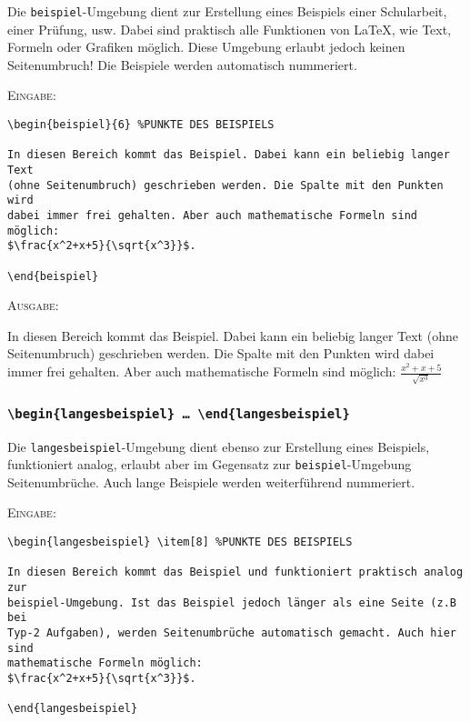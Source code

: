 \documentclass[a4paper,12pt]{article}
\begin{document}
Die \texttt{beispiel}-Umgebung dient zur Erstellung eines Beispiels einer Schularbeit, einer Prüfung, usw. Dabei sind praktisch alle Funktionen von \LaTeX, wie Text, Formeln oder Grafiken möglich. Diese Umgebung erlaubt jedoch keinen Seitenumbruch! Die Beispiele werden automatisch nummeriert.

\leer

\textsc{Eingabe:}
\begin{verbatim}
\begin{beispiel}{6} %PUNKTE DES BEISPIELS

In diesen Bereich kommt das Beispiel. Dabei kann ein beliebig langer Text
(ohne Seitenumbruch) geschrieben werden. Die Spalte mit den Punkten wird 
dabei immer frei gehalten. Aber auch mathematische Formeln sind möglich:
$\frac{x^2+x+5}{\sqrt{x^3}}$.

\end{beispiel}
\end{verbatim}

\leer

\textsc{Ausgabe:}\leer

\begin{beispiel}{6} %
In diesen Bereich kommt das Beispiel. Dabei kann ein beliebig langer Text
(ohne Seitenumbruch) geschrieben werden. Die Spalte mit den Punkten wird dabei 
immer frei gehalten. Aber auch mathematische Formeln sind möglich:
$\frac{x^2+x+5}{\sqrt{x^3}}$
\end{beispiel}

%
\vspace{1cm}

\subsubsection{\texttt{\textbackslash begin\{langesbeispiel\} \ldots\ \textbackslash end\{langesbeispiel\}}}

Die \texttt{langesbeispiel}-Umgebung dient ebenso zur Erstellung eines Beispiels, funktioniert analog, erlaubt aber im Gegensatz zur \texttt{beispiel}-Umgebung Seitenumbrüche. Auch lange Beispiele werden weiterführend nummeriert.

\leer

\textsc{Eingabe:}
\begin{verbatim}
\begin{langesbeispiel} \item[8] %PUNKTE DES BEISPIELS

In diesen Bereich kommt das Beispiel und funktioniert praktisch analog zur
beispiel-Umgebung. Ist das Beispiel jedoch länger als eine Seite (z.B bei 
Typ-2 Aufgaben), werden Seitenumbrüche automatisch gemacht. Auch hier sind
mathematische Formeln möglich:
$\frac{x^2+x+5}{\sqrt{x^3}}$.		

\end{langesbeispiel}

\end{verbatim}
\end{document}
